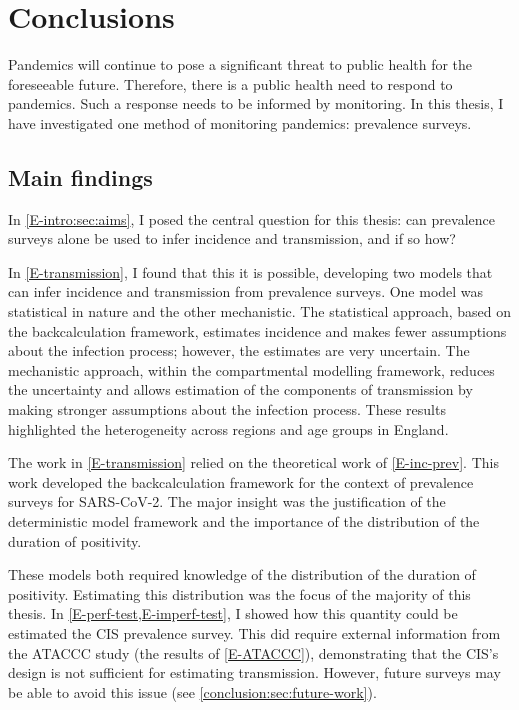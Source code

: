 \documentclass[thesis.tex]{subfiles}
\begin{document}
\ifSubfilesClassLoaded{
    \setcounter{chapter}{7}
}

\chapter{Conclusions} \label{conclusion}

Pandemics will continue to pose a significant threat to public health for the foreseeable future.
Therefore, there is a public health need to respond to pandemics.
Such a response needs to be informed by monitoring.
In this thesis, I have investigated one method of monitoring pandemics: prevalence surveys.

\section{Main findings}

In \cref{E-intro:sec:aims}, I posed the central question for this thesis: can prevalence surveys alone be used to infer incidence and transmission, and if so how?

In \cref{E-transmission}, I found that this it is possible, developing two models that can infer incidence and transmission from prevalence surveys.
One model was statistical in nature and the other mechanistic.
The statistical approach, based on the backcalculation framework, estimates incidence and makes fewer assumptions about the infection process; however, the estimates are very uncertain.
The mechanistic approach, within the compartmental modelling framework, reduces the uncertainty and allows estimation of the components of transmission by making stronger assumptions about the infection process.
These results highlighted the heterogeneity across regions and age groups in England.

The work in \cref{E-transmission} relied on the theoretical work of \cref{E-inc-prev}.
This work developed the backcalculation framework for the context of prevalence surveys for SARS-CoV-2.
The major insight was the justification of the deterministic model framework and the importance of the distribution of the duration of positivity.

These models both required knowledge of the distribution of the duration of positivity.
Estimating this distribution was the focus of the majority of this thesis.
In \cref{E-perf-test,E-imperf-test}, I showed how this quantity could be estimated the CIS prevalence survey.
This did require external information from the ATACCC study (the results of \cref{E-ATACCC}), demonstrating that the CIS's design is not sufficient for estimating transmission.
However, future surveys may be able to avoid this issue (see \cref{conclusion:sec:future-work}).
\end{document}

